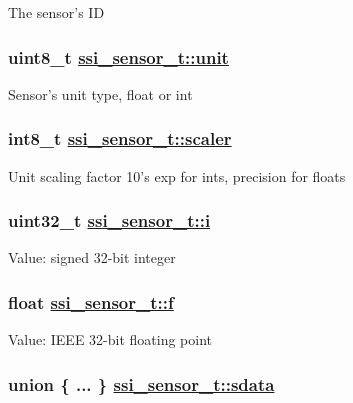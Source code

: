 The sensor's ID \hypertarget{structssi__sensor__t_a1f1ccefe0efae173472155afc32a384}{
\subsubsection[unit]{\setlength{\rightskip}{0pt plus 5cm}uint8\_\-t \hyperlink{structssi__sensor__t_a1f1ccefe0efae173472155afc32a384}{ssi\_\-sensor\_\-t::unit}}}
\label{structssi__sensor__t_a1f1ccefe0efae173472155afc32a384}


Sensor's unit type, float or int \hypertarget{structssi__sensor__t_6bbdc857baffd97f4832a621c5b15343}{
\subsubsection[scaler]{\setlength{\rightskip}{0pt plus 5cm}int8\_\-t \hyperlink{structssi__sensor__t_6bbdc857baffd97f4832a621c5b15343}{ssi\_\-sensor\_\-t::scaler}}}
\label{structssi__sensor__t_6bbdc857baffd97f4832a621c5b15343}


Unit scaling factor 10's exp for ints, precision for floats \hypertarget{structssi__sensor__t_a775f2114a8d9f1dea8a0cf9e1ce37b1}{
\subsubsection[i]{\setlength{\rightskip}{0pt plus 5cm}uint32\_\-t \hyperlink{structssi__sensor__t_a775f2114a8d9f1dea8a0cf9e1ce37b1}{ssi\_\-sensor\_\-t::i}}}
\label{structssi__sensor__t_a775f2114a8d9f1dea8a0cf9e1ce37b1}


Value: signed 32-bit integer \hypertarget{structssi__sensor__t_cb3e2bf1d106593a0f2dd9c35c0cf0fa}{
\subsubsection[f]{\setlength{\rightskip}{0pt plus 5cm}float \hyperlink{structssi__sensor__t_cb3e2bf1d106593a0f2dd9c35c0cf0fa}{ssi\_\-sensor\_\-t::f}}}
\label{structssi__sensor__t_cb3e2bf1d106593a0f2dd9c35c0cf0fa}


Value: IEEE 32-bit floating point \hypertarget{structssi__sensor__t_95657ef081129f8845132b27b88753b7}{
\subsubsection[sdata]{\setlength{\rightskip}{0pt plus 5cm}union \{ ... \}   \hyperlink{structssi__sensor__t_95657ef081129f8845132b27b88753b7}{ssi\_\-sensor\_\-t::sdata}}}
\label{structssi__sensor__t_95657ef081129f8845132b27b88753b7}



